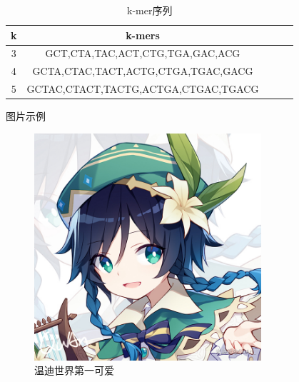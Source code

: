 \begin{table}[H]
\caption{k-mer序列}\label{tab:table1}
\vspace{0.5em}\centering\wuhao
\begin{tabular}{ccccc}
\toprule[1.5pt]
k & k-mers\\
\midrule[1pt]
3 & GCT,CTA,TAC,ACT,CTG,TGA,GAC,ACG     \\
4 & GCTA,CTAC,TACT,ACTG,CTGA,TGAC,GACG  \\
5 & GCTAC,CTACT,TACTG,ACTGA,CTGAC,TGACG \\
\bottomrule[1.5pt]
\end{tabular}
\vspace{\baselineskip}
\end{table}
图片示例
\begin{figure}[htb]
\centering
\includegraphics[width=0.75\textwidth]{Thesis/figures/windy.jpeg}
\caption{温迪世界第一可爱}\label{fig:k-mer1}
\vspace{2em}
\end{figure}
